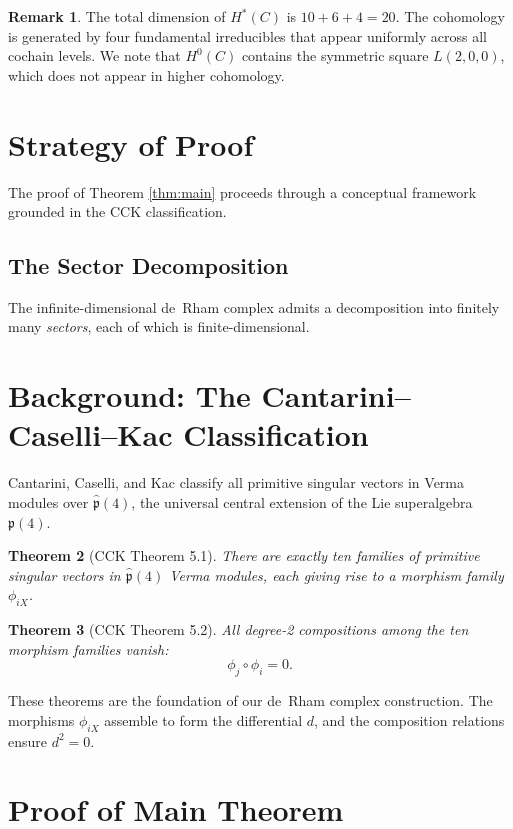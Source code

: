 \documentclass[reqno,10pt]{amsart}
\theoremstyle{plain}
\newtheorem{theorem}{Theorem}[section]
\theoremstyle{definition}
\newtheorem{remark}[theorem]{Remark}
\def\phat{\hat{\mathfrak{p}}}
\newcommand{\phat}{\hat{\mathfrak{p}}}
\begin{document}
\begin{remark}
  The total dimension of $H^*(C)$ is $10 + 6 + 4 = 20$. The cohomology is 
  generated by four fundamental irreducibles that appear uniformly across all 
  cochain levels. We note that $H^0(C)$ contains the symmetric square 
  $L(2,0,0)$, which does not appear in higher cohomology.
\end{remark}

\section{Strategy of Proof}

The proof of Theorem \ref{thm:main} proceeds through a conceptual framework 
grounded in the CCK classification.

\subsection{The Sector Decomposition}

The infinite-dimensional de~Rham complex admits a decomposition into finitely 
many \emph{sectors}, each of which is finite-dimensional.

\section{Background: The Cantarini--Caselli--Kac Classification}

Cantarini, Caselli, and Kac \cite{CCK2026} classify all primitive singular 
vectors in Verma modules over $\phat(4)$, the universal central extension of 
the Lie superalgebra $\mathfrak{p}(4)$.

\begin{theorem}[CCK Theorem 5.1]
  There are exactly ten families of primitive singular vectors in $\phat(4)$ 
  Verma modules, each giving rise to a morphism family $\phi_{iX}$.
\end{theorem}

\begin{theorem}[CCK Theorem 5.2]
  All degree-2 compositions among the ten morphism families vanish:
  \[
    \phi_j \circ \phi_i = 0.
  \]
\end{theorem}

These theorems are the foundation of our de~Rham complex construction. The 
morphisms $\phi_{iX}$ assemble to form the differential $d$, and the composition 
relations ensure $d^2 = 0$.

\section{Proof of Main Theorem}
\end{document}
